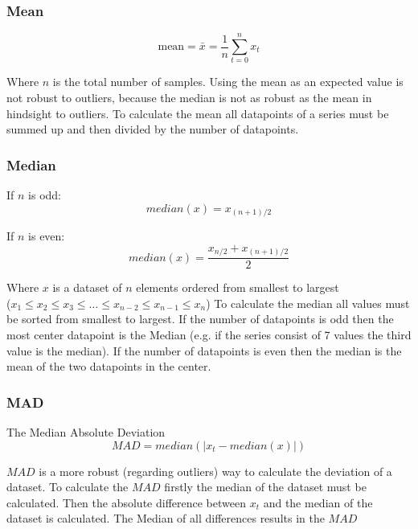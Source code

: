 \subsubsection{Mean}
\begin{equation}
  \text{mean} = \bar{x} = \frac{1}{n} \sum^n_{t=0}x_t
\end{equation}

Where $n$ is the total number of samples. Using the mean as an expected value is not robust to outliers, because the median is not as robust as the mean in hindsight to outliers. To calculate the mean all datapoints of a series must be summed up and then divided by the number of datapoints.
\subsubsection{Median}
If $n$ is odd:
\begin{equation}
  median(x) = x_{(n+1)/2}
\end{equation}

If $n$ is even:
\begin{equation}
  median(x) = \frac{x_{n/2} + x_{(n+1)/2}}{2}
\end{equation}

Where $x$ is a dataset of $n$ elements ordered from smallest to largest\\
($x_1 \leq x_2 \leq x_3 \leq \ldots \leq x_{n-2} \leq x_{n-1} \leq x_n$)
\cite{blazquez-garciaReviewOutlierAnomaly2020}
To calculate the median all values must be sorted from smallest to largest. If the number of datapoints is odd then the most center datapoint is the Median (e.g. if the series consist of 7 values the third value is the median). If the number of datapoints is even then the median is the mean of the two datapoints in the center.
\subsubsection{\ac{MAD}}
The Median Absolute Deviation 
\begin{equation}
  MAD = median(|x_t - median(x)|)
\end{equation}

$MAD$ is a more robust (regarding outliers) way to calculate the deviation of a dataset. To calculate the $MAD$ firstly the median of the dataset must be calculated. Then the absolute difference between $x_t$ and the median of the dataset is calculated. The Median of all differences results in the $MAD$
\cite{leysDetectingOutliersNot2013, mehrangOutlierDetectionWeight2015}

